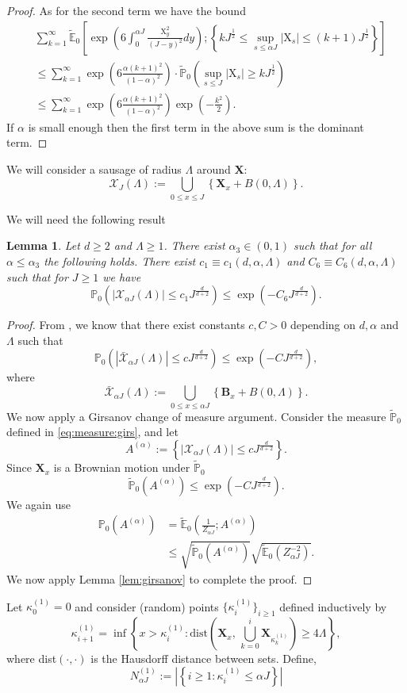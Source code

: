 \documentclass[12pt]{amsart}
\numberwithin{equation}{section}
\newtheorem{lem}{Lemma}[section]
\theoremstyle{definition}
\numberwithin{equation}{section}
\newcommand{\be}{\begin{equation}}
\newcommand{\ee}{\end{equation}}
\newcommand{\mP}{\mathbb{P}}
\newcommand{\X}{\mathbf{X}}
\newcommand{\E}{\mathbb{E}}
\begin{document}
\begin{proof}
As for the second term we have the bound
\begin{align*}
&\sum_{k=1}^\infty\tilde{\E}_0 \left[\exp\left(6\int_0^{\alpha J}\frac{\text{X}_y^2}{(J-y)^2}dy \right) ; \left\{k J^{\frac12}\le \sup_{s\le \alpha J}|\text{X}_s|\le (k+1)J^{\frac12}\right\} \right] \\
&\le \sum_{k=1}^{\infty} \exp\left(6\frac{\alpha(k+1)^2}{(1-\alpha)^2}\right) \cdot \tilde{\mP}_0\left(\sup_{s\le  J}|\text{X}_s| \ge k J^{\frac12}\right) \\
&\le \sum_{k=1}^{\infty} \exp\left(6\frac{\alpha(k+1)^2}{(1-\alpha)^2}\right) \exp\left(-\frac{k^2}{2}\right).
\end{align*}
If $\alpha$ is small enough then the first term in the above sum is the dominant term. 
\end{proof}

We will consider a sausage of radius $\Lambda$ around $\X$:
\[ \mathcal X_J(\Lambda) := \bigcup_{0\le x\le J}\left\{\X_x + B(0, \Lambda)\right\}.\]

We will need the following result 
\begin{lem} \label{lem:sau:tail} Let $d\ge 2$ and $\Lambda\ge 1$. There exist  $\alpha_3\in (0,1)$ such that for all $\alpha \le \alpha_3$ the following holds. There exist  $c_1\equiv c_1(d,\alpha,\Lambda)$ and  $C_6\equiv C_6(d,\alpha,\Lambda)$  such that for $J\ge 1$ we have 
\[ \mP_0\left( |\mathcal{X}_{\alpha J}(\Lambda)|\le c_1 J^{\frac{d}{d+2}}\right) \le \exp \left(-C_6 J^{\frac{d}{d+2}}\right).\]
\end{lem}
\begin{proof} 
  From \cite{dons-vara}, we know that there exist constants $c, C>0$ depending on $d,\alpha$ and $\Lambda$ such that 
\[ \mP_0\left( |\bar{\mathcal{X}}_{\alpha J}(\Lambda)|\le c J^{\frac{d}{d+2}}\right) \le \exp \left(-C J^{\frac{d}{d+2}}\right), \]
where 
\[ \bar{\mathcal X}_{\alpha J}(\Lambda) := \bigcup_{0\le x\le \alpha J}\left\{\mathbf{B}_x + B(0, \Lambda)\right\}.\]
We now apply a Girsanov change of measure argument. Consider the measure $\tilde{\mP}_0$ defined in \eqref{eq:measure:girs}, and let 
\[ A^{(\alpha)}:=\left\{|\mathcal{X}_{\alpha J}(\Lambda)|\le c J^{\frac{d}{d+2}}\right\}.\]
Since $\X_x$ is a Brownian motion under $\tilde{\mP}_0$ 
\be \label{eq:tpoa:ubd} \tilde{\mP}_0(A^{(\alpha)})  \le  \exp\left(-C J^{\frac{d}{d+2}}\right).\ee
We again use
\begin{align*}
\mP_0(A^{(\alpha)}) &= \tilde{\E}_0\left(\frac{1}{Z_{\alpha J}}; A^{(\alpha)}\right) \\
&\le \sqrt{\tilde{\mP}_0(A^{(\alpha)})}\sqrt{ \tilde{\E}_0\left(Z_{\alpha J}^{-2}\right)}.
\end{align*}
We now apply Lemma \ref{lem:girsanov} to complete the proof. 
\end{proof}
Let $\kappa^{(1)}_0=0$ and consider (random) points $\{\kappa^{(1)}_i\}_{i \geq 1}$ defined inductively by
\[ \kappa^{(1)}_{i+1} =\inf\left\{x>\kappa^{(1)}_i: \text{dist}\left(\X_x,\, \bigcup_{k=0}^i \X_{\kappa^{(1)}_k}\right)\ge 4\Lambda\right\},\]
where dist$(\cdot, \cdot)$ is the Hausdorff distance between sets. Define,
\[ N^{(1)}_{\alpha J}:= \left\vert\left\{i\ge 1: \kappa^{(1)}_i \le \alpha J\right\} \right\vert\]
\end{document}

